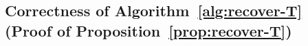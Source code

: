 \subsection{Correctness of Algorithm~\ref{alg:recover-T} (Proof of Proposition~\ref{prop:recover-T})}
